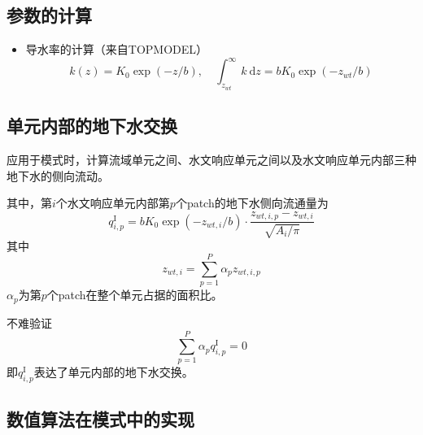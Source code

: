 \subsection{参数的计算}
\begin{itemize}
\item 导水率的计算（来自TOPMODEL）
\begin{equation}
k(z) = K_0\exp{(- z/b)},\quad \int^\infty_{z_{wt}} k\ \mathrm{d}z = b K_0\exp{(-z_{wt}/b)}
\end{equation}
\end{itemize}


\subsection{单元内部的地下水交换}
应用于模式时，计算流域单元之间、水文响应单元之间以及水文响应单元内部三种地下水的侧向流动。

其中，第$i$个水文响应单元内部第$p$个patch的地下水侧向流通量为
\begin{equation}
q^{\mathrm{I}}_{i,p} = b K_0 \exp{(-z_{wt,i}/b)}\cdot\frac{z_{wt,i,p}-z_{wt,i}}{\sqrt{A_i/\pi}}
\end{equation}
其中
$$z_{wt,i} = \sum^P_{p=1} \alpha_p z_{wt,i,p}$$
$\alpha_p$为第$p$个patch在整个单元占据的面积比。

不难验证
$$\sum^P_{p=1} \alpha_p q^{\mathrm{I}}_{i,p} =0$$
即$q^{\mathrm{I}}_{i,p}$表达了单元内部的地下水交换。

\subsection{数值算法在模式中的实现}

